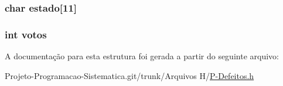 \hypertarget{structdefeito_a4365c78a9264f318b8bc48995318ef85}{
\subsubsection[{estado}]{\setlength{\rightskip}{0pt plus 5cm}char estado\mbox{[}11\mbox{]}}}\label{structdefeito_a4365c78a9264f318b8bc48995318ef85}
\hypertarget{structdefeito_a919763f0f66461a8344b645bc82bd54c}{
\subsubsection[{votos}]{\setlength{\rightskip}{0pt plus 5cm}int votos}}\label{structdefeito_a919763f0f66461a8344b645bc82bd54c}


A documentação para esta estrutura foi gerada a partir do seguinte arquivo\-:\begin{DoxyCompactItemize}
\item 
Projeto-\/\-Programacao-\/\-Sistematica.\-git/trunk/\-Arquivos H/\hyperlink{_p-_defeitos_8h}{P-\/\-Defeitos.\-h}\end{DoxyCompactItemize}
